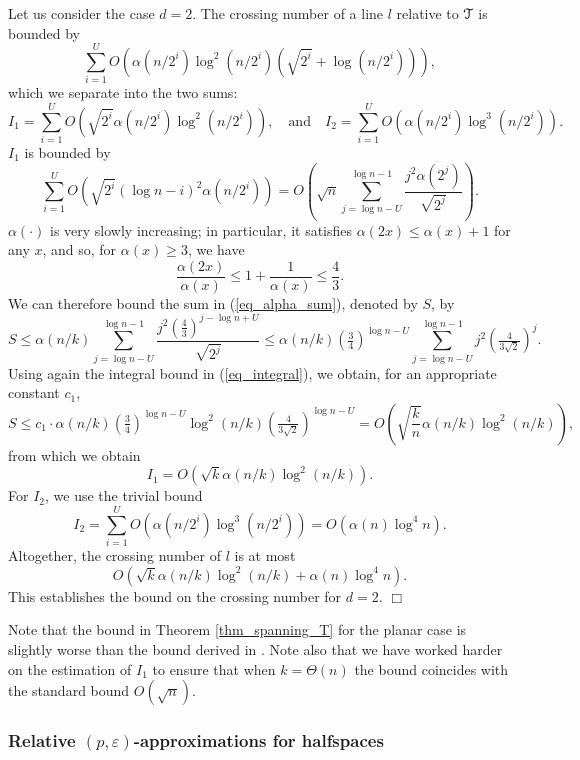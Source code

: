 \documentclass[11pt]{article}
\newcommand{\Tree}{\EuScript{T}}
\def\peps{(p,\varepsilon)}
\begin{document}
Let us consider the case $d = 2$. The crossing number of a line $l$ relative to $\Tree$ is bounded by
$$
\sum_{i=1}^{U}O\left(\alpha(n/2^{i}) \log^{2}(n/2^{i}) \left(\sqrt{2^{i}} + \log(n/2^{i})\right) \right),
$$
which we separate into the two sums:
$$
I_{1} = \sum_{i=1}^{U} O\left(\sqrt{2^{i}} \alpha(n/2^{i}) \log^{2}(n/2^{i})\right), \quad \mbox{and} \quad I_{2} = \sum_{i=1}^{U} O\left(\alpha(n/2^{i})\log^{3}(n/2^{i})\right).
$$
$I_{1}$ is bounded by
\begin{equation} \label{eq_alpha_sum}
\sum_{i=1}^{U}O\left(\sqrt{2^{i}}(\log n - i)^{2}\alpha(n/2^{i})\right) =
O\left(\sqrt n \sum_{j=\log n - U}^{\log n - 1}\frac{j^{2}\alpha(2^{j})}{\sqrt{2^{j}}}\right).
\end{equation}
$\alpha(\cdot)$ is very slowly increasing; in particular, it satisfies $\alpha(2x) \leq \alpha(x)+1$ for any $x$, and so, for $\alpha(x) \geq 3$, we have
$$
\frac{\alpha(2x)}{\alpha(x)} \leq 1 + \frac{1}{\alpha(x)} \leq \frac{4}{3}.
$$
We can therefore bound the sum in (\ref{eq_alpha_sum}), denoted by $S$, by
$$
S \leq \alpha(n/k) \sum_{j=\log n - U}^{\log n - 1} \frac{j^{2} \left(\tfrac{4}{3}\right)^{j - \log n + U}}{\sqrt{2^{j}}} \leq \alpha(n/k) \left(\tfrac{3}{4}\right)^{\log n - U} \sum_{j=\log n - U}^{\log n - 1} j^{2} \left(\tfrac{4}{3\sqrt{2}}\right)^{j}.
$$
Using again the integral bound in (\ref{eq_integral}), we obtain, for an appropriate constant $c_{1}$,
$$
S \leq c_{1} \cdot \alpha(n/k) \left(\tfrac{3}{4}\right)^{\log n - U} \log^{2}(n/k) \left(\tfrac{4}{3\sqrt{2}}\right)^{\log n - U} = O\left(\sqrt{\frac{k}{n}} \alpha(n/k) \log^{2}(n/k)\right),
$$
from which we obtain
$$
I_{1} = O\left(\sqrt{k} \alpha(n/k) \log^{2}(n/k)\right).
$$
For $I_{2}$, we use the trivial bound
$$
I_{2} = \sum_{i=1}^{U} O\left(\alpha(n/2^{i})\log^{3}(n/2^{i})\right) = O\left(\alpha(n)\log^{4}n \right).
$$
Altogether, the crossing number of $l$ is at most
$$
O\left(\sqrt{k}\alpha(n/k)\log^{2}(n/k) + \alpha(n)\log^{4}n \right).
$$
This establishes the bound on the crossing number for $d = 2$. $\Box$

 Note that the bound in Theorem \ref{thm_spanning_T} for the planar case is slightly worse than the bound derived in \cite{hs11}. Note also that we have worked harder on the estimation of $I_{1}$ to ensure that when $k = \Theta(n)$ the bound coincides with the standard bound $O(\sqrt{n})$.



\subsubsection{Relative $\peps$-approximations for halfspaces}
\end{document}
